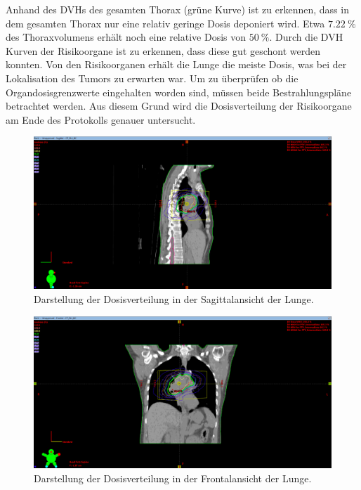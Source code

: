 Anhand des DVHs des gesamten Thorax (grüne Kurve) ist zu erkennen, dass in dem gesamten Thorax nur eine relativ geringe Dosis deponiert wird.
Etwa $\SI{7,22}{\percent}$ des Thoraxvolumens erhält noch eine relative Dosis von $\SI{50}{\percent}$.
Durch die DVH Kurven der Risikoorgane ist zu erkennen, dass diese gut geschont werden konnten.
Von den Risikoorganen erhält die Lunge die meiste Dosis, was bei der Lokalisation des Tumors zu erwarten war.
Um zu überprüfen ob die Organdosisgrenzwerte eingehalten worden sind, müssen beide Bestrahlungspläne betrachtet werden.
Aus diesem Grund wird die Dosisverteilung der Risikoorgane am Ende des Protokolls genauer untersucht.

\begin{figure}[H]
	\centering
	\includegraphics[width=\linewidth]{Bilder/Lunge1_X}
	\caption{Darstellung der Dosisverteilung in der Sagittalansicht der Lunge.}
	\label{fig:lunge1x}
\end{figure}

\begin{figure}[H]
	\centering
	\includegraphics[width=\linewidth]{Bilder/Lunge1_Y}
	\caption{Darstellung der Dosisverteilung in der Frontalansicht  der Lunge.}
	\label{fig:lunge1y}
\end{figure}

